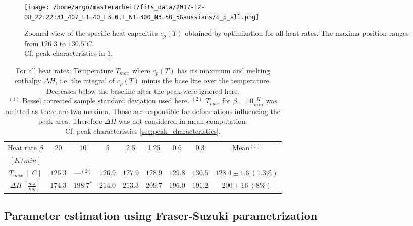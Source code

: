 \documentclass{scrartcl}[12pt, halfparskip]
\numberwithin{equation}{section}
\numberwithin{figure}{section}
\numberwithin{table}{section}
\begin{document}
\begin{figure}[H]
	\centering
	\texttt{[image: /home/argo/masterarbeit/fits\_data/2017-12-08\_22:22:31\_407\_L1=40\_L3=0,1\_N1=300\_N3=50\_5Gaussians/c\_p\_all.png]}
	\caption{Zoomed view of the specific heat capacities $c_p(T)$ obtained by optimization for all heat rates. The maxima position ranges from $126.3$ to $130.5^{\circ}C$. \\
	Cf. peak characteristics in \cref{tab:eval_table_Tmax_deltaH_5Gaussians}.}
	\label{fig:5Gaussians_all_c_p}
\end{figure}


\begin{table}[H]
	\centering
	\begin{tabular}{| c | c | c | c | c | c | c | c || c |} \hline
		Heat rate $\beta$ & 20 & 10 & 5 & 2.5 & 1.25 & 0.6 & 0.3 & Mean$^{(1)}$ \\
		$[K/min]$ & & & & & & & & \\ \hline
		$T_{max} \ [^{\circ}C]$ & $126.3$ & ---$^{(2)}$ & $126.9$ & $127.9$ & $128.9$ & $129.8$ & $130.5$ & $128.4 \pm 1.6 \ (1.3\%)$ \\[0.7ex]
		$\Delta H \ [\frac{mJ}{mg}]$ & $174.3$ & $198.7^*$ & $214.0$ & $213.3$ & $209.7$ & $196.0$ & $191.2$ & $200 \pm 16 \ (8\%)$ \\ \hline
	\end{tabular}
	\caption{For all heat rates: Temperature $T_{max}$ where $c_p(T)$ has its maximum and melting enthalpy $\Delta H$, i.e. the integral of $c_p(T)$ minus the base line over the temperature. Decreases below the baseline after the peak were ignored here. \\
	$^{(1)}$ Bessel corrected sample standard deviation used here. $^{(2)}$ $T_{max}$ for $\beta=10\frac{K}{min}$ was omitted as there are two maxima. Those are responsible for deformations influencing the peak area. Therefore $\Delta H$ was not considered in mean computation. \\
	Cf. peak characteristics \cref{sec:peak_characteristics}.
	}
	\label{tab:eval_table_Tmax_deltaH_5Gaussians}
\end{table}


\subsection{Parameter estimation using Fraser-Suzuki parametrization}
\label{sec:param_estimation_fs}
\end{document}
